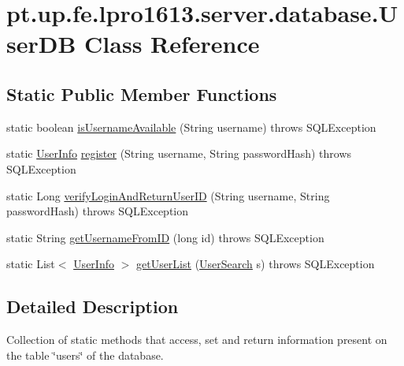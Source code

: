 \hypertarget{classpt_1_1up_1_1fe_1_1lpro1613_1_1server_1_1database_1_1_user_d_b}{}\section{pt.\+up.\+fe.\+lpro1613.\+server.\+database.\+User\+DB Class Reference}
\label{classpt_1_1up_1_1fe_1_1lpro1613_1_1server_1_1database_1_1_user_d_b}
\subsection*{Static Public Member Functions}
\begin{DoxyCompactItemize}
\item 
static boolean \hyperlink{classpt_1_1up_1_1fe_1_1lpro1613_1_1server_1_1database_1_1_user_d_b_ab6501b54b7768d7d854a68dd9ed1b830}{is\+Username\+Available} (String username)  throws S\+Q\+L\+Exception 
\item 
static \hyperlink{classpt_1_1up_1_1fe_1_1lpro1613_1_1sharedlib_1_1structs_1_1_user_info}{User\+Info} \hyperlink{classpt_1_1up_1_1fe_1_1lpro1613_1_1server_1_1database_1_1_user_d_b_a1bcefeca4058dd57c0d2c0a7387af2e1}{register} (String username, String password\+Hash)  throws S\+Q\+L\+Exception 
\item 
static Long \hyperlink{classpt_1_1up_1_1fe_1_1lpro1613_1_1server_1_1database_1_1_user_d_b_ac3083ed924599ce2b694ce622676bca6}{verify\+Login\+And\+Return\+User\+ID} (String username, String password\+Hash)  throws S\+Q\+L\+Exception 
\item 
static String \hyperlink{classpt_1_1up_1_1fe_1_1lpro1613_1_1server_1_1database_1_1_user_d_b_ab5c986eb5c2ba36eef3defee599c6903}{get\+Username\+From\+ID} (long id)  throws S\+Q\+L\+Exception 
\item 
static List$<$ \hyperlink{classpt_1_1up_1_1fe_1_1lpro1613_1_1sharedlib_1_1structs_1_1_user_info}{User\+Info} $>$ \hyperlink{classpt_1_1up_1_1fe_1_1lpro1613_1_1server_1_1database_1_1_user_d_b_a954a448685644afc277007bdf36bb507}{get\+User\+List} (\hyperlink{classpt_1_1up_1_1fe_1_1lpro1613_1_1sharedlib_1_1structs_1_1_user_search}{User\+Search} s)  throws S\+Q\+L\+Exception 
\end{DoxyCompactItemize}


\subsection{Detailed Description}
Collection of static methods that access, set and return information present on the table \char`\"{}users\char`\"{} of the database.

